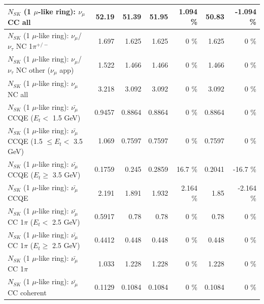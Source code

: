\begin{table}
\begin{tabular}{| l | r | r | r  r | r  r |}
                                $N_{SK}$ (1 $\mu$-like ring): $\nu_{\mu}$ CC all &           52.19 &           51.39 &           51.95 &    1.094 \%  &           50.83 &   -1.094 \%  \\ 
\hline
              $N_{SK}$ (1 $\mu$-like ring): $\nu_\mu$/$\nu_\tau$ NC 1$\pi^{+/-}$ &           1.697 &           1.625 &           1.625 &        0 \%  &           1.625 &        0 \%  \\ 
     $N_{SK}$ (1 $\mu$-like ring): $\nu_\mu$/$\nu_\tau$ NC other ($\nu_\mu$ app) &           1.522 &           1.466 &           1.466 &        0 \%  &           1.466 &        0 \%  \\ 
                                $N_{SK}$ (1 $\mu$-like ring): $\nu_{\mu}$ NC all &           3.218 &           3.092 &           3.092 &        0 \%  &           3.092 &        0 \%  \\ 
\hline
\hline
\hline
          $N_{SK}$ (1 $\mu$-like ring): $\bar{\nu_\mu}$ CCQE ($E_{t} <$ 1.5 GeV) &          0.9457 &          0.8864 &          0.8864 &        0 \%  &          0.8864 &        0 \%  \\ 
 $N_{SK}$ (1 $\mu$-like ring): $\bar{\nu_\mu}$ CCQE (1.5 $\leq E_{t} <$ 3.5 GeV) &           1.069 &          0.7597 &          0.7597 &        0 \%  &          0.7597 &        0 \%  \\ 
       $N_{SK}$ (1 $\mu$-like ring): $\bar{\nu_\mu}$ CCQE ($E_{t} \geq$ 3.5 GeV) &          0.1759 &           0.245 &          0.2859 &     16.7 \%  &          0.2041 &    -16.7 \%  \\ 
\hline
                              $N_{SK}$ (1 $\mu$-like ring): $\bar{\nu_\mu}$ CCQE &           2.191 &           1.891 &           1.932 &    2.164 \%  &            1.85 &   -2.164 \%  \\ 
\hline
     $N_{SK}$ (1 $\mu$-like ring): $\bar{\nu_\mu}$ CC 1$\pi$ ($E_{t} <$ 2.5 GeV) &          0.5917 &            0.78 &            0.78 &        0 \%  &            0.78 &        0 \%  \\ 
  $N_{SK}$ (1 $\mu$-like ring): $\bar{\nu_\mu}$ CC 1$\pi$ ($E_{t} \geq$ 2.5 GeV) &          0.4412 &           0.448 &           0.448 &        0 \%  &           0.448 &        0 \%  \\ 
\hline
                         $N_{SK}$ (1 $\mu$-like ring): $\bar{\nu_\mu}$ CC 1$\pi$ &           1.033 &           1.228 &           1.228 &        0 \%  &           1.228 &        0 \%  \\ 
                       $N_{SK}$ (1 $\mu$-like ring): $\bar{\nu_\mu}$ CC coherent &          0.1129 &          0.1084 &          0.1084 &        0 \%  &          0.1084 &        0 \%  \\ 

\end{tabular}
\end{table}
